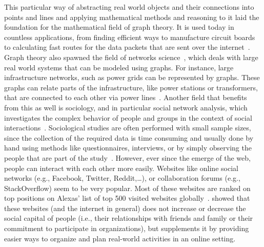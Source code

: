 This particular way of abstracting real world objects and their connections into points and lines and applying mathematical methods and reasoning to it laid the foundation for the mathematical field of graph theory.
It is used today in countless applications, from finding efficient ways to manufacture circuit boards~\cite{Cook2012} to calculating fast routes for the data packets that are sent over the internet~\cite{Wang1999}.
Graph theory also spawned the field of networks science~\cite{Newman2010}, which deals with large real world systems that can be modeled using graphs.
For instance, large infrastructure networks, such as power grids can be represented by graphs.
These graphs can relate parts of the infrastructure, like power stations or transformers, that are connected to each other via power lines~\cite{Watts1998}.
Another field that benefits from this as well is sociology, and in particular social network analysis, which investigates the complex behavior of people and groups in the context of social interactions~\cite{Newman2010}.
Sociological studies are often performed with small sample sizes, since the collection of the required data is time consuming and usually done by hand using methods like questionnaires, interviews, or by simply observing the people that are part of the study~\cite{Wasserman1994}.
However, ever since the emerge of the web, people can interact with each other more easily.
Websites like online social networks (e.g., Facebook, Twitter, Reddit,\ldots), or collaboration forums (e.g., StackOverflow) seem to be very popular.
Most of these websites are ranked on top positions on Alexas' list of top 500 visited websites globally~\cite{Alexa2017}.
\citet{Wellman2001} showed that these websites (and the internet in general) does not increase or decrease the social capital of people (i.e., their relationships with friends and family or their commitment to participate in organizations), but supplements it by providing easier ways to organize and plan real-world activities in an online setting.

